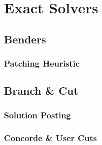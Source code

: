 \chapter{Exact Solvers}

\section{Benders}

\subsection{Patching Heuristic}

\section{Branch \& Cut}

\subsection{Solution Posting}

\subsection{Concorde \& User Cuts}